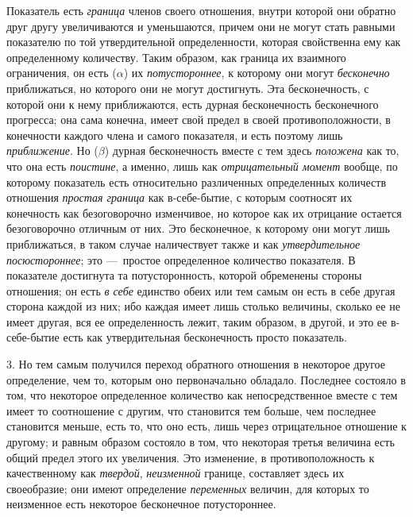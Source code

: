 Показатель есть {\em граница} членов своего отношения,
внутри которой они обратно друг другу увеличиваются и уменьшаются, причем
они не могут стать равными показателю по той утвердительной определенности,
которая свойственна ему как определенному количеству. Таким образом, как
граница их взаимного ограничения, он есть ({\em $\alpha
$}) их {\em потустороннее}, к которому они могут
{\em бесконечно} приближаться, но которого они не могут
достигнуть. Эта бесконечность, с которой они к нему приближаются, есть
дурная бесконечность бесконечного прогресса; она сама конечна, имеет свой
предел в своей противоположности, в конечности каждого члена и самого
показателя, и есть поэтому лишь {\em приближение}. Но
({\em $\beta $}) дурная бесконечность вместе с тем
здесь {\em положена} как то, что она есть
{\em поистине}, а именно, лишь как
{\em отрицательный момент} вообще, по которому
показатель есть относительно различенных определенных количеств отношения
{\em простая граница} как в-себе-бытие, с которым
соотносят их конечность как безоговорочно изменчивое, но которое как их
отрицание остается безоговорочно отличным от них. Это бесконечное, к
которому они могут лишь приближаться, в таком случае наличествует также и
как {\em утвердительное посюстороннее}; это —~простое
определенное количество показателя. В показателе достигнута та
потусторонность, которой обременены стороны отношения; он есть
{\em в себе} единство обеих или тем самым он есть в
себе другая сторона каждой из них; ибо каждая имеет лишь столько величины,
сколько ее не имеет другая, вся ее определенность лежит, таким образом, в
другой, и это ее в-себе-бытие есть как утвердительная бесконечность просто
показатель.

3. Но тем самым получился переход обратного отношения в некоторое другое
определение, чем то, которым оно первоначально обладало. Последнее состояло
в том, что некоторое определенное количество как непосредственное вместе с
тем имеет то соотношение с другим, что становится тем больше, чем последнее
становится меньше, есть то, что оно есть, лишь через отрицательное
отношение к другому; и равным образом состояло в том, что некоторая третья
величина есть общий предел этого их увеличения. Это изменение, в
противоположность к качественному как {\em твердой},
{\em неизменной} границе, составляет здесь их
своеобразие; они имеют определение {\em переменных}
величин, для которых то неизменное есть некоторое бесконечное
потустороннее.

